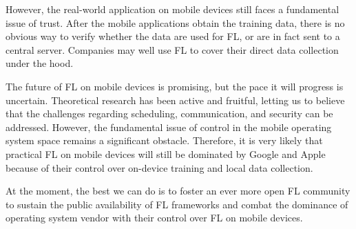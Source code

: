 \documentclass[conference]{IEEEtran}
\begin{document}
However, the real-world application on mobile devices still faces a fundamental
issue of trust.
After the mobile applications obtain the training data,
there is no obvious way to verify whether the data are used for FL,
or are in fact sent to a central server.
Companies may well use FL to cover their direct data collection under the hood.

The future of FL on mobile devices is promising,
but the pace it will progress is uncertain.
Theoretical research has been active and fruitful,
letting us to believe that the challenges regarding scheduling, communication,
and security can be addressed.
However, the fundamental issue of control in the mobile operating system space
remains a significant obstacle.
Therefore, it is very likely that practical FL on mobile devices will
still be dominated by Google and Apple because of
their control over on-device training and local data collection.

At the moment,
the best we can do is to foster an ever more open FL community to
sustain the public availability of FL frameworks and
combat the dominance of operating system vendor with
their control over FL on mobile devices.

\printbibliography
\end{document}
